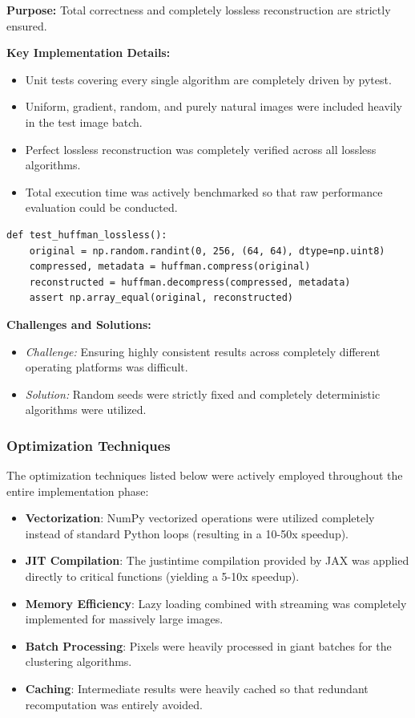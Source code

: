 \textbf{Purpose:} Total correctness and completely lossless reconstruction are strictly ensured.

\textbf{Key Implementation Details:}
\begin{itemize}
    \item Unit tests covering every single algorithm are completely driven by pytest.
    \item Uniform, gradient, random, and purely natural images were included heavily in the test image batch.
    \item Perfect lossless reconstruction was completely verified across all lossless algorithms.
    \item Total execution time was actively benchmarked so that raw performance evaluation could be conducted.
\end{itemize}

\begin{verbatim}
def test_huffman_lossless():
    original = np.random.randint(0, 256, (64, 64), dtype=np.uint8)
    compressed, metadata = huffman.compress(original)
    reconstructed = huffman.decompress(compressed, metadata)
    assert np.array_equal(original, reconstructed)
\end{verbatim}

\textbf{Challenges and Solutions:}
\begin{itemize}
    \item \textit{Challenge:} Ensuring highly consistent results across completely different operating platforms was difficult.
    \item \textit{Solution:} Random seeds were strictly fixed and completely deterministic algorithms were utilized.
\end{itemize}

\subsubsection{Optimization Techniques}

The optimization techniques listed below were actively employed throughout the entire implementation phase:

\begin{itemize}
    \item \textbf{Vectorization}: NumPy vectorized operations were utilized completely instead of standard Python loops (resulting in a 10-50x speedup).
    \item \textbf{JIT Compilation}: The justintime compilation provided by JAX was applied directly to critical functions (yielding a 5-10x speedup).
    \item \textbf{Memory Efficiency}: Lazy loading combined with streaming was completely implemented for massively large images.
    \item \textbf{Batch Processing}: Pixels were heavily processed in giant batches for the clustering algorithms.
    \item \textbf{Caching}: Intermediate results were heavily cached so that redundant recomputation was entirely avoided.
\end{itemize}

